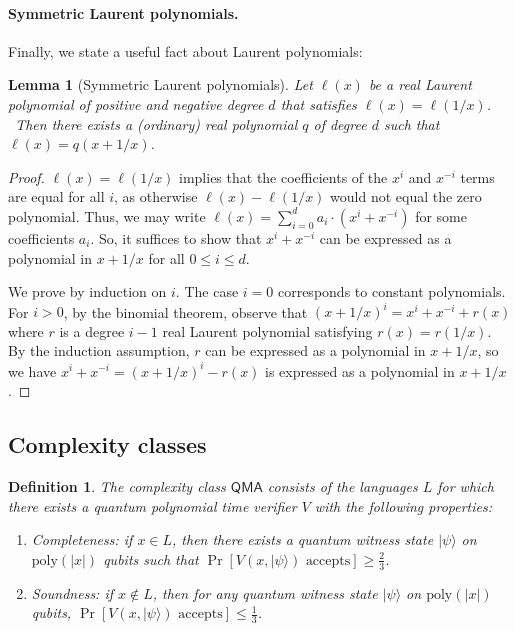 \documentclass[10pt,a4paper]{article}
\newtheorem{definition}[theorem]{Definition}
\newtheorem{lemma}[theorem]{Lemma}
\newcommand{\<}{\langle}
\renewcommand{\>}{\rangle}
\newcommand{\para}[1]{\paragraph{#1}}
\begin{document}
\para{Symmetric Laurent polynomials.}
Finally, we state a useful fact about Laurent polynomials:

\begin{lemma}[Symmetric Laurent polynomials]
\label{lem:symmetric} Let $\ell (x)$ be a real Laurent polynomial of positive
and negative degree $d$ that satisfies $\ell (x)=\ell (1/x)$. \ Then there exists a (ordinary) real
polynomial $q$ of degree $d$ such that $\ell (x)=q(x+1/x)$.
\end{lemma}

\begin{proof}
$\ell(x) = \ell(1/x)$ implies that the coefficients of the $x^i$ and $x^{-i}$ terms are equal for all $i$, as otherwise $\ell(x) - \ell(1/x)$ would not equal the zero polynomial. Thus, we may write $\ell(x) = \sum_{i=0}^d a_i \cdot (x^i + x^{-i})$ for some coefficients $a_i$. So, it suffices to show that $x^i + x^{-i}$ can be expressed as a polynomial in $x + 1/x$ for all $0 \le i \le d$.

We prove by induction on $i$. The case $i = 0$ corresponds to constant polynomials. For $i > 0$, by the binomial theorem, observe that $(x + 1/x)^i = x^i + x^{-i} + r(x)$ where $r$ is a degree $i - 1$ real Laurent polynomial satisfying $r(x) = r(1/x)$. By the induction assumption, $r$ can be expressed as a polynomial in $x + 1/x$, so we have $x^i + x^{-i} = (x + 1/x)^i - r(x)$ is expressed as a polynomial in $x + 1/x$.
\end{proof}

%
\subsection{Complexity classes}

\begin{definition}
\label{def:qma}
The complexity class $\mathsf{QMA}$ consists of the
languages $L$ for which there exists a quantum polynomial time
verifier $V$ with the following properties:

\begin{enumerate}
\item Completeness: if $x \in L$, then there exists a quantum witness state $|\psi\>$ on $\mathrm{poly}(|x|)$ qubits such that $\Pr\left[V(x, |\psi\>) \text{ accepts}\right] \ge \frac{2}{3}$.

\item Soundness: if $x \not\in L$, then for any quantum witness state $|\psi\>$ on $\mathrm{poly}(|x|)$ qubits, $\Pr\left[V(x, |\psi\>) \text{ accepts}\right] \le \frac{1}{3}$.
\end{enumerate}
\end{definition}
\end{document}
